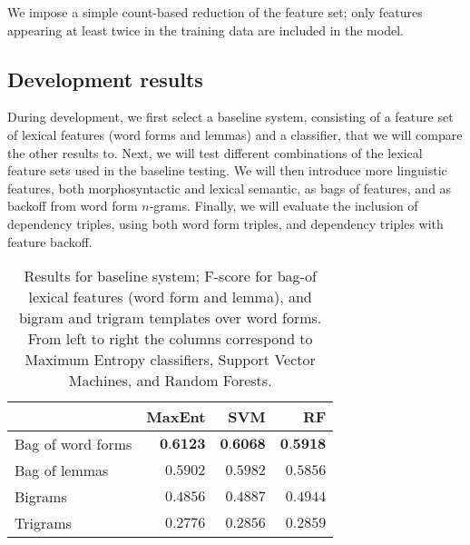 \documentclass[11pt,letterpaper]{article}
\begin{document}
We impose a simple count-based reduction of the feature set; only features appearing at least twice in the training data are included in the model.


\subsection{Development results}

During development, we first select a baseline system, consisting of a feature set of lexical features (word forms and lemmas) and a classifier, that we will compare the other results to. Next, we will test different combinations of the lexical feature sets used in the baseline testing. We will then introduce more linguistic features, both morphosyntactic and lexical semantic, as bags of features, and as backoff from word form $n$-grams. Finally, we will evaluate the inclusion of dependency triples, using both word form triples, and dependency triples with feature backoff.

\begin{table}
  \begin{smaller}
    \begin{center}
      \begin{tabular}{lrrr}
        \toprule

        & MaxEnt & SVM & RF \\
        \midrule
        Bag of word forms & $\textbf{0.6123}$ & $\textbf{0.6068}$ & $\textbf{0.5918}$ \\ %
        Bag of lemmas & $0.5902$ & $0.5982$ & $0.5856$ \\
        Bigrams & $0.4856$ & $0.4887$ & $0.4944$ \\
        Trigrams & $0.2776$ & $0.2856$ & $0.2859$ \\
      
      
        \bottomrule
      \end{tabular}
    \end{center}
    \caption{Results for baseline system; F-score for bag-of lexical features
      (word form and lemma), and bigram and trigram templates over word
      forms. From left to right the columns correspond to Maximum Entropy
      classifiers, Support Vector Machines, and Random Forests.}
    \label{tab:baseline}
  \end{smaller}
\end{table}
\end{document}
